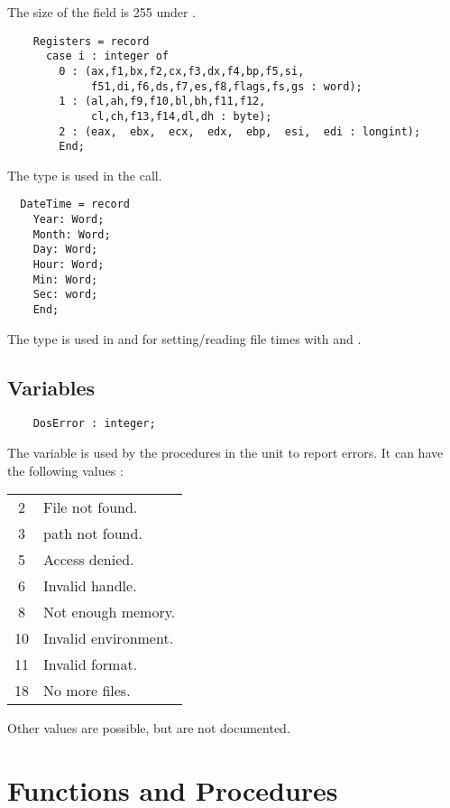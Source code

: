 The size of the  field is 255 under \linux.
\begin{verbatim}
    Registers = record
      case i : integer of
        0 : (ax,f1,bx,f2,cx,f3,dx,f4,bp,f5,si,
             f51,di,f6,ds,f7,es,f8,flags,fs,gs : word);
        1 : (al,ah,f9,f10,bl,bh,f11,f12,
             cl,ch,f13,f14,dl,dh : byte);
        2 : (eax,  ebx,  ecx,  edx,  ebp,  esi,  edi : longint);
        End;
\end{verbatim}
The   type is used in the  call.
\begin{verbatim}
  DateTime = record
    Year: Word;
    Month: Word;
    Day: Word;
    Hour: Word;
    Min: Word;
    Sec: word;
    End;
\end{verbatim}
The  type is used in  and  for
setting/reading file times with  and .

\subsection{Variables}
\begin{verbatim}
    DosError : integer;
\end{verbatim}
The  variable is used by the procedures in the \dos unit to 
report errors. It can have the following values :
\begin{center}
\begin{tabular}{cl}
2 & File not found. \\
3 & path not found. \\
5 & Access denied. \\
6 & Invalid handle. \\
8 & Not enough memory. \\
10 & Invalid environment. \\
11 & Invalid format. \\
18 & No more files.
\end{tabular}
\end{center}
Other values are possible, but are not documented.

\section{Functions and Procedures}

